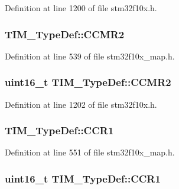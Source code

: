 Definition at line 1200 of file stm32f10x.\+h.

\subsubsection[{\texorpdfstring{C\+C\+M\+R2}{CCMR2}}]{ T\+I\+M\+\_\+\+Type\+Def\+::\+C\+C\+M\+R2}\hypertarget{struct_t_i_m___type_def_a2dee82a7b37cbb2c0e58b3b67a88b0a7}{}\label{struct_t_i_m___type_def_a2dee82a7b37cbb2c0e58b3b67a88b0a7}


Definition at line 539 of file stm32f10x\+\_\+map.\+h.

\subsubsection[{\texorpdfstring{C\+C\+M\+R2}{CCMR2}}]{ {\bf uint16\+\_\+t} T\+I\+M\+\_\+\+Type\+Def\+::\+C\+C\+M\+R2}\hypertarget{struct_t_i_m___type_def_a22bb9f39aae46365d3ec3c5973f90039}{}\label{struct_t_i_m___type_def_a22bb9f39aae46365d3ec3c5973f90039}


Definition at line 1202 of file stm32f10x.\+h.

\subsubsection[{\texorpdfstring{C\+C\+R1}{CCR1}}]{ T\+I\+M\+\_\+\+Type\+Def\+::\+C\+C\+R1}\hypertarget{struct_t_i_m___type_def_aa4bb22d5ee6b682984a00f078c6071fe}{}\label{struct_t_i_m___type_def_aa4bb22d5ee6b682984a00f078c6071fe}


Definition at line 551 of file stm32f10x\+\_\+map.\+h.

\subsubsection[{\texorpdfstring{C\+C\+R1}{CCR1}}]{ {\bf uint16\+\_\+t} T\+I\+M\+\_\+\+Type\+Def\+::\+C\+C\+R1}\hypertarget{struct_t_i_m___type_def_a537cdfa9f0229951c2d624be6de74977}{}\label{struct_t_i_m___type_def_a537cdfa9f0229951c2d624be6de74977}


